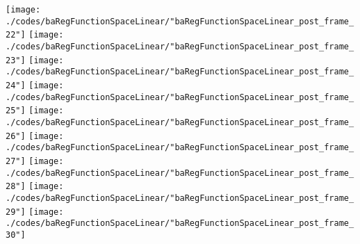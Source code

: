 \begin{frame}{\insertsection}
\begin{center}
{\begin{animateinline}{15}
				 \texttt{[image: ./codes/baRegFunctionSpaceLinear/"baRegFunctionSpaceLinear\_post\_frame\_22"]}\newframe
				 \texttt{[image: ./codes/baRegFunctionSpaceLinear/"baRegFunctionSpaceLinear\_post\_frame\_23"]}\newframe
				 \texttt{[image: ./codes/baRegFunctionSpaceLinear/"baRegFunctionSpaceLinear\_post\_frame\_24"]}\newframe
				 \texttt{[image: ./codes/baRegFunctionSpaceLinear/"baRegFunctionSpaceLinear\_post\_frame\_25"]}\newframe
				 \texttt{[image: ./codes/baRegFunctionSpaceLinear/"baRegFunctionSpaceLinear\_post\_frame\_26"]}\newframe
				 \texttt{[image: ./codes/baRegFunctionSpaceLinear/"baRegFunctionSpaceLinear\_post\_frame\_27"]}\newframe
				 \texttt{[image: ./codes/baRegFunctionSpaceLinear/"baRegFunctionSpaceLinear\_post\_frame\_28"]}\newframe
				 \texttt{[image: ./codes/baRegFunctionSpaceLinear/"baRegFunctionSpaceLinear\_post\_frame\_29"]}\newframe
				 \texttt{[image: ./codes/baRegFunctionSpaceLinear/"baRegFunctionSpaceLinear\_post\_frame\_30"]}
			 \end{animateinline}
			}
	\end{center}
    
\end{frame}

